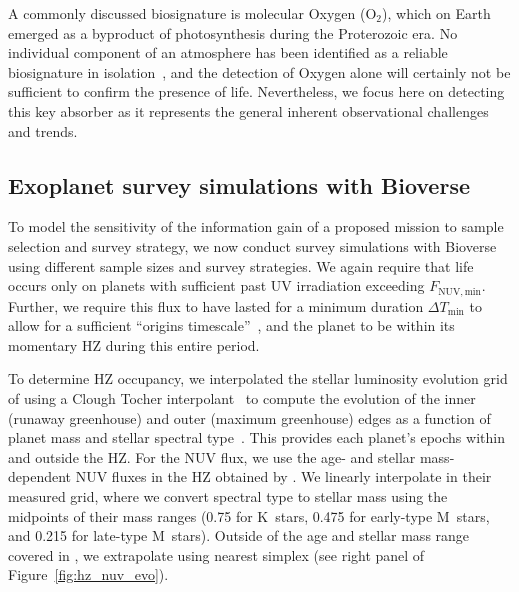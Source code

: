 \documentclass[modern,linenumbers]{aastex631}
\begin{document}
A commonly discussed biosignature is molecular Oxygen (O$_2$), which on Earth emerged as a byproduct of photosynthesis during the Proterozoic era.
No individual component of an atmosphere has been identified as a reliable biosignature in isolation~\citep{Seager2016}, and the detection of Oxygen alone will certainly not be sufficient to confirm the presence of life.
Nevertheless, we focus here on detecting this key absorber as it represents the general inherent observational challenges and trends.







\subsection{Exoplanet survey simulations with Bioverse}
To model the sensitivity of the information gain of a proposed mission to sample selection and survey strategy, we now conduct survey simulations with Bioverse using different sample sizes and survey strategies.
We again require that life occurs only on planets with sufficient past UV irradiation exceeding $F_\mathrm{NUV, min}$.
Further, we require this flux to have lasted for a minimum duration $\Delta T_\mathrm{min}$ to allow for a sufficient ``origins timescale''~\citep{Rimmer2023}, and the planet to be within its momentary \gls{HZ} during this entire period.

To determine \gls{HZ} occupancy, we interpolated the stellar luminosity evolution grid of \citet{Baraffe1998} using a Clough Tocher interpolant~\citep[][see left panel of Figure~\ref{fig:hz_nuv_evo}]{Nielson1983,Alfeld1984} to compute the evolution of the inner (runaway greenhouse) and outer (maximum greenhouse) edges as a function of planet mass and stellar spectral type~\citep{Kopparapu2014}.
This provides each planet's epochs within and outside the \gls{HZ}.
For the \gls{NUV} flux, we use the age- and stellar mass-dependent \gls{NUV} fluxes in the \gls{HZ} obtained by \citet{Richey-Yowell2023}.
We linearly interpolate in their measured grid, where we convert spectral type to stellar mass using the midpoints of their mass ranges (\SI{0.75}{\Msun} for K~stars, \SI{0.475}{\Msun} for early-type M~stars,  and \SI{0.215}{\Msun} for late-type M~stars).
Outside of the age and stellar mass range covered in \citet{Richey-Yowell2023}, we extrapolate using nearest simplex (see right panel of Figure~\ref{fig:hz_nuv_evo}).
\end{document}

